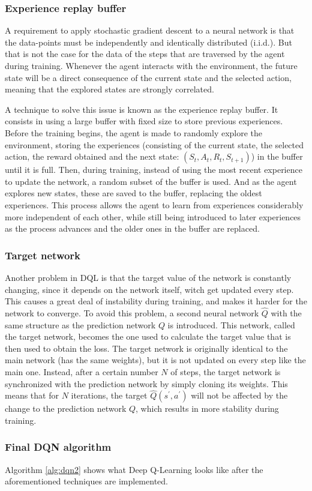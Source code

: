 \subsubsection*{Experience replay buffer}

A requirement to apply stochastic gradient descent to a neural network is that the data-points must be independently and identically distributed (i.i.d.). But that is not the case for the data of the steps that are traversed by the agent during training. Whenever the agent interacts with the environment, the future state will be a direct consequence of the current state and the selected action, meaning that the explored states are strongly correlated.

A technique to solve this issue is known as the experience replay buffer. It consists in using a large buffer with fixed size to store previous experiences. Before the training begins, the agent is made to randomly explore the environment, storing the experiences (consisting of the current state, the selected action, the reward obtained and the next state: $(S_t, A_t, R_t, S_{t+1})$) in the buffer until it is full. Then, during training, instead of using the most recent experience to update the network, a random subset of the buffer is used. And as the agent explores new states, these are saved to the buffer, replacing the oldest experiences. This process allows the agent to learn from experiences considerably more independent of each other, while still being introduced to later experiences as the process advances and the older ones in the buffer are replaced.

\subsubsection*{Target network}

Another problem in DQL is that the target value of the network is constantly changing, since it depends on the network itself, witch get updated every step. This causes a great deal of instability during training, and makes it harder for the network to converge. To avoid this problem, a second neural network $\hat{Q}$ with the same structure as the prediction network $Q$ is introduced. This network, called the target network, becomes the one used to calculate the target value that is then used to obtain the loss. The target network is originally identical to the main network (has the same weights), but it is not updated on every step like the main one. Instead, after a certain number $N$ of steps, the target network is synchronized with the prediction network by simply cloning its weights. This means that for $N$ iterations, the target $\hat{Q}(s^\prime, a^\prime)$ will not be affected by the change to the prediction network $Q$, which results in more stability during training.

\subsubsection*{Final DQN algorithm}

Algorithm \ref{alg:dqn2} shows what Deep Q-Learning looks like after the aforementioned techniques are implemented.

